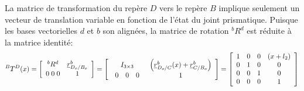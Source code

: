 La matrice de transformation du repère $D$ vers le repère $B$ implique seulement un vecteur de translation variable en fonction de l'état du joint prismatique. Puisque les bases vectorielles $d$ et $b$ son alignées, la matrice de rotation $^bR^d$ est réduite à la matrice identité:
\begin{align}
	^BT^D(x)
	=
	\left[ \begin{array}{c c }
			   ^bR^d  & \underline{r}_{D_o/B_o}^b \\ 0 \; 0 \; 0 & 1
	\end{array} \right]
	= \left[ \begin{array}{c c }
				 I_{3\times3} & \left( \underline{r}_{D_o/C}^b(x) + \underline{r}_{C/B_o}^b \right) \\
				 \begin{array}{c c c}
					 0 & 0 & 0
				 \end{array} & 1
	\end{array} \right]
	=
	\left[ \begin{array}{c c c c}
			   1 & 0 & 0 & (x + l_2)  \\
			   0 & 1 & 0 & 0  \\
			   0 & 0 & 1 & 0  \\
			   0 & 0 & 0 & 1
	\end{array} \right]
\end{align}

